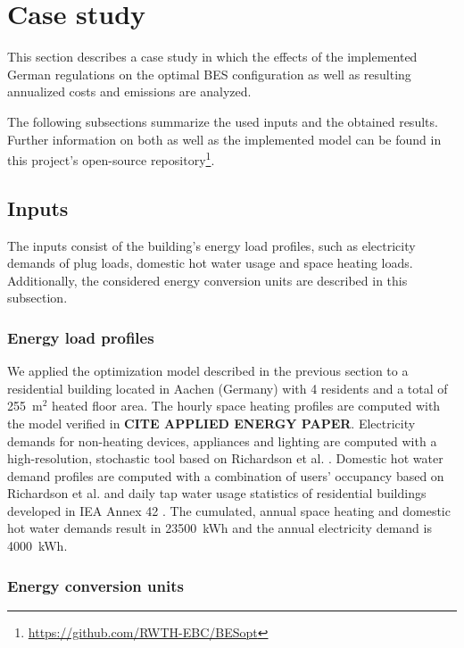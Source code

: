 \section{Case study}
\label{sec:Case study}

This section describes a case study in which the effects of the implemented German regulations on the optimal BES configuration as well as resulting annualized costs and emissions are analyzed.

The following subsections summarize the used inputs and the obtained results.
Further information on both as well as the implemented model can be found in this project's open-source repository\footnote{\url{https://github.com/RWTH-EBC/BESopt}}.

\subsection{Inputs}

The inputs consist of the building's energy load profiles, such as electricity demands of plug loads, domestic hot water usage and space heating loads.
Additionally, the considered energy conversion units are described in this subsection.

\subsubsection{Energy load profiles}

We applied the optimization model described in the previous section to a residential building located in Aachen (Germany) with 4 residents and a total of 255~m$^2$ heated floor area.
The hourly space heating profiles are computed with the model verified in \textbf{CITE APPLIED ENERGY PAPER}.
Electricity demands for non-heating devices, appliances and lighting are computed with a high-resolution, stochastic tool based on Richardson et al. \cite{Richardson2010}.
Domestic hot water demand profiles are computed with a combination of users' occupancy based on Richardson et al. \cite{Richardson2010} and daily tap water usage statistics of residential buildings developed in IEA Annex 42 \cite{IEAEnergyConservationinBuildingsCommunitySystems}.
The cumulated, annual space heating and domestic hot water demands result in 23500~kWh and the annual electricity demand is 4000~kWh.

\subsubsection{Energy conversion units}

